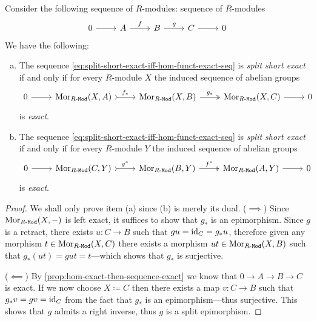 \begin{lemma}
\label{lem:split-short-exact-iff-hom-funct-exact-seq}
Consider the following sequence of \(R\)-modules: sequence of \(R\)-modules
\begin{equation}\label{eq:split-short-exact-iff-hom-funct-exact-seq}
\begin{tikzcd}
0 \ar[r]
&A \ar[r, "f"]
&B \ar[r, "g"]
&C \ar[r]
&0
\end{tikzcd}
\end{equation}
We have the following:
\begin{enumerate}[(a)]\setlength\itemsep{0em}
\item The sequence \cref{eq:split-short-exact-iff-hom-funct-exact-seq} is
  \emph{split short exact} if and only if for every \(R\)-module \(X\) the
  induced sequence of abelian groups
  \[
  \begin{tikzcd}
  0 \ar[r]
  &\Mor_{\Mod R}(X, A)
  \ar[r, tail, "f_{*}"]
  &\Mor_{\Mod R}(X, B)
  \ar[r, two heads, "g_{*}"]
  &\Mor_{\Mod R}(X, C)
  \ar[r]
  &0
  \end{tikzcd}
  \]
  is \emph{exact}.

\item The sequence \cref{eq:split-short-exact-iff-hom-funct-exact-seq} is
  \emph{split short exact} if and only if for every \(R\)-module \(Y\) the
  induced sequence of abelian groups
  \[
  \begin{tikzcd}
  0 \ar[r]
  &\Mor_{\Mod R}(C, Y)
  \ar[r, tail, "g^{*}"]
  &\Mor_{\Mod R}(B, Y)
  \ar[r, two heads, "f^{*}"]
  &\Mor_{\Mod R}(A, Y)
  \ar[r]
  &0
  \end{tikzcd}
  \]
  is \emph{exact}.
\end{enumerate}
\end{lemma}

\begin{proof}
We shall only prove item (a) since (b) is merely its dual. (\(\implies\)) Since
\(\operatorname{Mor}_{{R\text{-}\texttt{Mod}}}(X, -)\) is left exact, it suffices to show that \(g_{*}\) is an
epimorphism. Since \(g\) is a retract, there exists \(u: C \to B\) such that
\(g u = \operatorname{id}_C = g_{*} u\), therefore given any morphism
\(t \in \operatorname{Mor}_{{R\text{-}\texttt{Mod}}}(X, C)\) there exists a morphism
\(u t \in \operatorname{Mor}_{{R\text{-}\texttt{Mod}}}(X, B)\) such that \(g_{*}(u t) = g u t = t\)---which shows
that \(g_{*}\) is surjective.

(\(\impliedby\)) By \cref{prop:hom-exact-then-sequence-exact} we know that
\(0 \to A \to B \to C\) is exact. If we now choose \(X \coloneq C\) then there exists a map
\(v: C \to B\) such that \(g_{*} v = g v = \operatorname{id}_C\) from the fact that \(g_{*}\) is
an epimorphism---thus surjective. This shows that \(g\) admits a right inverse,
thus \(g\) is a split epimorphism.
\end{proof}

